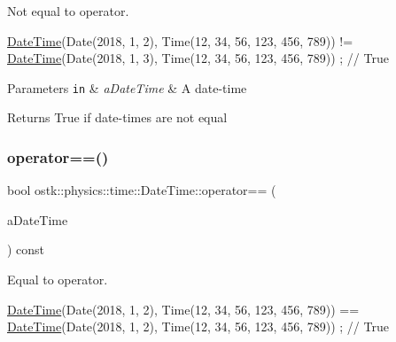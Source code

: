 Not equal to operator. 


\begin{DoxyCode}
\hyperlink{classostk_1_1physics_1_1time_1_1_date_time_a974b5a7581ae7461ccf0e6ab85e42633}{DateTime}(Date(2018, 1, 2), Time(12, 34, 56, 123, 456, 789)) != \hyperlink{classostk_1_1physics_1_1time_1_1_date_time_a974b5a7581ae7461ccf0e6ab85e42633}{DateTime}(Date(2018, 1, 3), 
      Time(12, 34, 56, 123, 456, 789)) ; \textcolor{comment}{// True}
\end{DoxyCode}



\begin{DoxyParams}[1]{Parameters}
\mbox{\tt in}  & {\em a\+Date\+Time} & A date-\/time \\
\hline
\end{DoxyParams}
\begin{DoxyReturn}{Returns}
True if date-\/times are not equal 
\end{DoxyReturn}
\mbox{\label{classostk_1_1physics_1_1time_1_1_date_time_a8ffda673aa698ebe33cd4c4d4a041ef6}} 
\subsubsection{\texorpdfstring{operator==()}{operator==()}}
{\footnotesize\ttfamily bool ostk\+::physics\+::time\+::\+Date\+Time\+::operator== (\begin{DoxyParamCaption}\item[{const \hyperlink{classostk_1_1physics_1_1time_1_1_date_time}{Date\+Time} \&}]{a\+Date\+Time }\end{DoxyParamCaption}) const}



Equal to operator. 


\begin{DoxyCode}
\hyperlink{classostk_1_1physics_1_1time_1_1_date_time_a974b5a7581ae7461ccf0e6ab85e42633}{DateTime}(Date(2018, 1, 2), Time(12, 34, 56, 123, 456, 789)) == \hyperlink{classostk_1_1physics_1_1time_1_1_date_time_a974b5a7581ae7461ccf0e6ab85e42633}{DateTime}(Date(2018, 1, 2), 
      Time(12, 34, 56, 123, 456, 789)) ; \textcolor{comment}{// True}
\end{DoxyCode}



